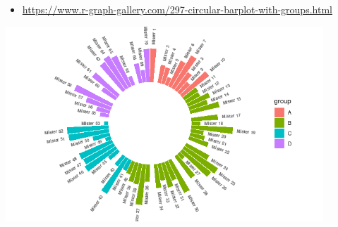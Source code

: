 \documentclass[
]{book}
\providecommand{\tightlist}{%
  \setlength{\itemsep}{0pt}\setlength{\parskip}{0pt}}
\begin{document}
\begin{itemize}
\tightlist
\item
  \url{https://www.r-graph-gallery.com/297-circular-barplot-with-groups.html}
\end{itemize}

\includegraphics[width=4.6875in,height=\textheight]{images/10/000002.png}
\end{document}
